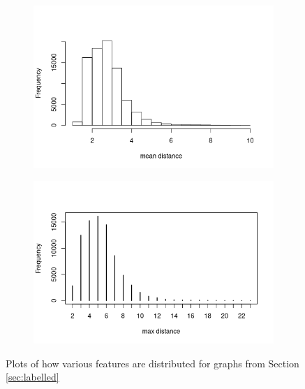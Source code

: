 \documentclass{l4proj}
\theoremstyle{definition}
\theoremstyle{remark}
\begin{document}
\begin{figure}
\begin{subfigure}[t]{0.49\textwidth}
  \end{subfigure}
  \begin{subfigure}[t]{0.49\textwidth}
    \centering
    \includegraphics[width=\textwidth]{images/mcs_meandist.png}
  \end{subfigure}
  \begin{subfigure}[t]{0.49\textwidth}
    \centering
    \includegraphics[width=\textwidth]{images/mcs_maxdist.png}
  \end{subfigure}
  \caption{Plots of how various features are distributed for graphs from Section
  \ref{sec:labelled}}
  \label{fig:mcs_features1}
\end{figure}
\end{document}
